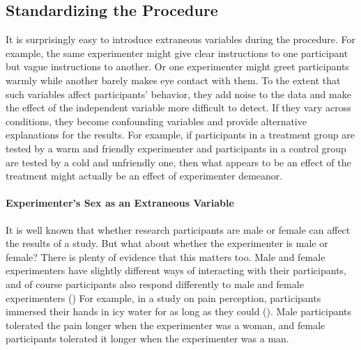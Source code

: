 \documentclass[
]{krantz}
\begin{document}
\subsection*{Standardizing the Procedure}\label{standardizing-the-procedure}


It is surprisingly easy to introduce extraneous variables during the procedure. For example, the same experimenter might give clear instructions to one participant but vague instructions to another. Or one experimenter might greet participants warmly while another barely makes eye contact with them. To the extent that such variables affect participants' behavior, they add noise to the data and make the effect of the independent variable more difficult to detect. If they vary across conditions, they become confounding variables and provide alternative explanations for the results. For example, if participants in a treatment group are tested by a warm and friendly experimenter and participants in a control group are tested by a cold and unfriendly one, then what appears to be an effect of the treatment might actually be an effect of experimenter demeanor.

\paragraph*{Experimenter's Sex as an Extraneous Variable}\label{experimenters-sex-as-an-extraneous-variable}

It is well known that whether research participants are male or female can affect the results of a study. But what about whether the experimenter is male or female? There is plenty of evidence that this matters too. Male and female experimenters have slightly different ways of interacting with their participants, and of course participants also respond differently to male and female experimenters () For example, in a study on pain perception, participants immersed their hands in icy water for as long as they could (). Male participants tolerated the pain longer when the experimenter was a woman, and female participants tolerated it longer when the experimenter was a man.
\end{document}
